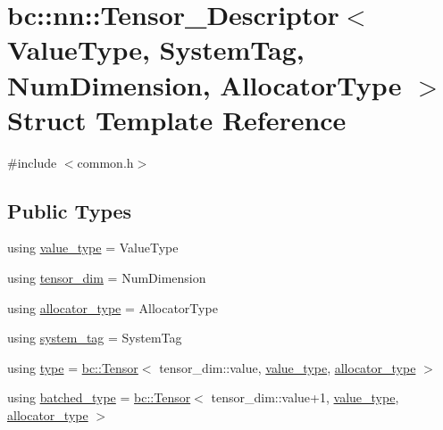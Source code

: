 \hypertarget{structbc_1_1nn_1_1Tensor__Descriptor}{}\section{bc\+:\+:nn\+:\+:Tensor\+\_\+\+Descriptor$<$ Value\+Type, System\+Tag, Num\+Dimension, Allocator\+Type $>$ Struct Template Reference}
\label{structbc_1_1nn_1_1Tensor__Descriptor}


{\ttfamily \#include $<$common.\+h$>$}

\subsection*{Public Types}
\begin{DoxyCompactItemize}
\item 
using \hyperlink{structbc_1_1nn_1_1Tensor__Descriptor_a25a52c900dabe88f90eba926ff8de1cd}{value\+\_\+type} = Value\+Type
\item 
using \hyperlink{structbc_1_1nn_1_1Tensor__Descriptor_ac5c6e6bec82a01ad10cd2e6acc439532}{tensor\+\_\+dim} = Num\+Dimension
\item 
using \hyperlink{structbc_1_1nn_1_1Tensor__Descriptor_ad5bd24271db1a9fb05b06cb64cad55a3}{allocator\+\_\+type} = Allocator\+Type
\item 
using \hyperlink{structbc_1_1nn_1_1Tensor__Descriptor_a206ee1df4b7e175b426f8cdb32d0a342}{system\+\_\+tag} = System\+Tag
\item 
using \hyperlink{structbc_1_1nn_1_1Tensor__Descriptor_a9a0efa6c050542ee479a59bb8a252230}{type} = \hyperlink{namespacebc_a659391e47ab612be3ba6c18cf9c89159}{bc\+::\+Tensor}$<$ tensor\+\_\+dim\+::value, \hyperlink{structbc_1_1nn_1_1Tensor__Descriptor_a25a52c900dabe88f90eba926ff8de1cd}{value\+\_\+type}, \hyperlink{structbc_1_1nn_1_1Tensor__Descriptor_ad5bd24271db1a9fb05b06cb64cad55a3}{allocator\+\_\+type} $>$
\item 
using \hyperlink{structbc_1_1nn_1_1Tensor__Descriptor_a5d27a53dccd4d6334aa3fd4092b07a9e}{batched\+\_\+type} = \hyperlink{namespacebc_a659391e47ab612be3ba6c18cf9c89159}{bc\+::\+Tensor}$<$ tensor\+\_\+dim\+::value+1, \hyperlink{structbc_1_1nn_1_1Tensor__Descriptor_a25a52c900dabe88f90eba926ff8de1cd}{value\+\_\+type}, \hyperlink{structbc_1_1nn_1_1Tensor__Descriptor_ad5bd24271db1a9fb05b06cb64cad55a3}{allocator\+\_\+type} $>$
\end{DoxyCompactItemize}



